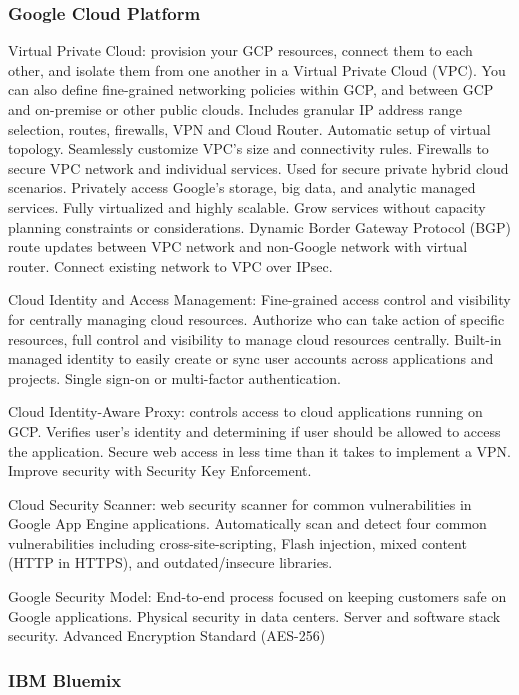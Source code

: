\subsubsection{Google Cloud Platform}
Virtual Private Cloud: provision your GCP resources, connect them to each other, and isolate them from one another in a Virtual Private Cloud (VPC). You can also define fine-grained networking policies within GCP, and between GCP and on-premise or other public clouds. Includes granular IP address range selection, routes, firewalls, VPN and Cloud Router. Automatic setup of virtual topology. Seamlessly customize VPC's size and connectivity rules. Firewalls to secure VPC network and individual services. Used for secure private hybrid cloud scenarios. Privately access Google's storage, big data, and analytic managed services. Fully virtualized and highly scalable. Grow services without capacity planning constraints or considerations. Dynamic Border Gateway Protocol (BGP) route updates between VPC network and non-Google network with virtual router. Connect existing network to VPC over IPsec. 

Cloud Identity and Access Management: Fine-grained access control and visibility for centrally managing cloud resources. Authorize who can take action of specific resources, full control and visibility to manage cloud resources centrally. Built-in managed identity to easily create or sync user accounts across applications and projects. Single sign-on or multi-factor authentication. 

Cloud Identity-Aware Proxy: controls access to cloud applications running on GCP. Verifies user's identity and determining if user should be allowed to access the application. Secure web access in less time than it takes to implement a VPN. Improve security with Security Key Enforcement. 

Cloud Security Scanner: web security scanner for common vulnerabilities in Google App Engine applications. Automatically scan and detect four common vulnerabilities including cross-site-scripting, Flash injection, mixed content (HTTP in HTTPS), and outdated/insecure libraries. 

Google Security Model: End-to-end process focused on keeping customers safe on Google applications. Physical security in data centers. Server and software stack security. Advanced Encryption Standard (AES-256)  

\subsubsection{IBM Bluemix}

